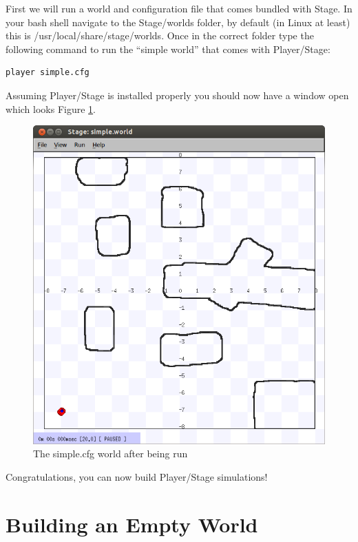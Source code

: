\documentclass[a4paper]{report}
\newcommand{\plst}{Player/Stage\xspace}
\begin{document}
First we will run a world and configuration file that comes bundled with Stage. In your bash shell navigate to the Stage/worlds folder, by default (in Linux at least) this is /usr/local/share/stage/worlds. Once in the correct folder type the following command to run the ``simple world'' that comes with \plst:
\begin{verbatim}
player simple.cfg
\end{verbatim}
Assuming \plst is installed properly you should now have a window open which looks Figure \ref{fig:BuildingAWorld:SimpleWorld}.
\begin{figure}
	\centering
	\includegraphics[width=0.8\linewidth]{./pics/simpleworld.png}
	\caption{The simple.cfg world after being run}
	\label{fig:BuildingAWorld:SimpleWorld}
\end{figure}

Congratulations, you can now build Player/Stage simulations! 


\section{Building an Empty World} \label{sec:BuildingAWorld:EmptyWorld}
\end{document}
